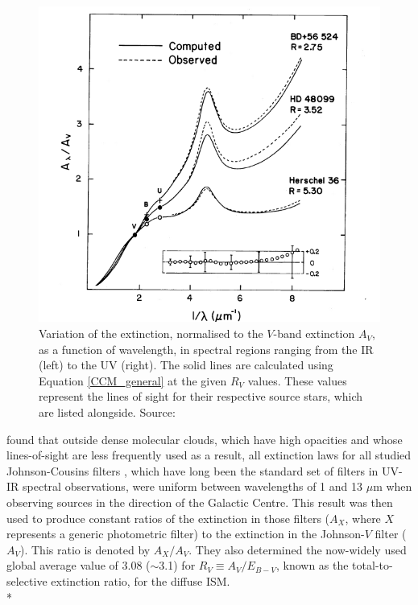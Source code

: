 \documentclass[12pt, a4paper]{report}
\begin{document}
\begin{figure}[h!]
\begin{center}
\includegraphics[width=1.0\textwidth]{cardelli_curve_fig4_crop.png}
\caption{Variation of the extinction, normalised to the $V$-band extinction $A_{V}$, as a function of wavelength, in spectral regions ranging from the IR (left) to the UV (right). The solid lines are calculated using Equation \ref{CCM_general} at the given $R_{V}$ values. These values represent the lines of sight for their respective source stars, which are listed alongside.  Source: \cite{1989ApJ...345..245C}}
\label{cardelli_curve}
\end{center}
\end{figure}

\cite{1985ApJ...288..618R} found that outside dense molecular clouds, which have high opacities and whose lines-of-sight are less frequently used as a result, all extinction laws for all studied Johnson-Cousins filters \citep{1953ApJ...117..313J}, which have long been the standard set of filters in UV-IR spectral observations, were uniform between wavelengths of 1 and 13 $\mu$m when observing sources in the direction of the Galactic Centre. This result was then used to produce constant ratios of the extinction in those filters ($A_{X}$, where $X$ represents a generic photometric filter) to the extinction in the Johnson-$V$ filter ($A_{V}$). This ratio is denoted by $A_{X}/A_{V}$. They also determined the now-widely used global average value of 3.08 ($\sim$3.1) for $R_{V} \equiv A_{V}/E_{B-V}$, known as the total-to-selective extinction ratio,  for the diffuse ISM. \\*
\end{document}
